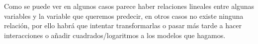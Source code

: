 \documentclass[11pt]{article}
\begin{document}
    
    
    \begin{center}
    \end{center}
    { \hspace*{\fill} \\}
    
    
    
    \begin{center}
    \end{center}
    { \hspace*{\fill} \\}
    
    
    
    \begin{center}
    \end{center}
    { \hspace*{\fill} \\}
    
    
    
    \begin{center}
    \end{center}
    { \hspace*{\fill} \\}
    
    \begin{center}
    \end{center}
    { \hspace*{\fill} \\}
    
    Como se puede ver en algunos casos parece haber relaciones lineales
entre algunas variables y la variable que queremos predecir, en otros
casos no existe ninguna relación, por ello habrá que intentar
transformarlas o pasar más tarde a hacer interacciones o añadir
cuadrados/logaritmos a los modelos que hagamos.
\end{document}
